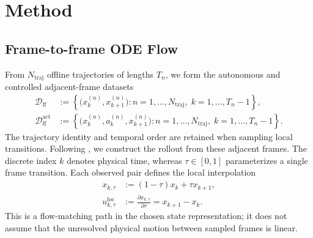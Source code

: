\section{Method}
\label{sec:method}

\subsection{Frame-to-frame ODE Flow}
\label{sec:frame-to-frame-method}
From $N_{\mathrm{traj}}$ offline trajectories of lengths $T_n$, we form the
autonomous and controlled adjacent-frame datasets
\begin{align}
  \mathcal D_{\mathrm{ff}}
  &:={\left\{
      \bigl(x_k^{(n)},x_{k+1}^{(n)}\bigr)
      : n=1,\ldots,N_{\mathrm{traj}},\;
        k=1,\ldots,T_n-1
    \right\}},
  \label{eq:problem_uncontrolled_pairs}\\
  \mathcal D_{\mathrm{ff}}^{\mathrm{act}}
  &:={\left\{
      \bigl(x_k^{(n)},a_k^{(n)},x_{k+1}^{(n)}\bigr)
      : n=1,\ldots,N_{\mathrm{traj}},\;
        k=1,\ldots,T_n-1
    \right\}}.
  \label{eq:problem_controlled_pairs}
\end{align}
The trajectory identity and temporal order are retained when sampling local
transitions.  Following \citet{lim2026flow}, we construct the rollout from
these adjacent frames.
The discrete index $k$ denotes physical time, whereas
$\tau\in[0,1]$ parameterizes a single frame transition.  Each observed pair
defines the local interpolation
\begin{align}
  x_{k,\tau}
  &:=(1-\tau)x_k+\tau x_{k+1},
  \label{eq:method_frame_interpolation}\\
  u_{k,\tau}^{\mathrm{loc}}
  &:=\frac{\partial x_{k,\tau}}{\partial\tau}
   =x_{k+1}-x_k.
  \label{eq:method_frame_velocity}
\end{align}
This is a flow-matching path in the chosen state representation; it does not
assume that the unresolved physical motion between sampled frames is linear.

